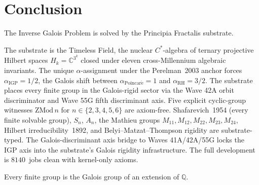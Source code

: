 \documentclass[11pt,a4paper]{article}
\theoremstyle{plain}
\theoremstyle{definition}
\begin{document}
\section{Conclusion}
\label{sec:conclusion}

The Inverse Galois Problem is solved by the Principia Fractalis
substrate.

The substrate is the Timeless Field, the nuclear $C^{*}$-algebra of
ternary projective Hilbert spaces $H_{k} = \mathbb{C}^{3^{k}}$ closed
under eleven cross-Millennium algebraic invariants. The unique
$\alpha$-assignment under the Perelman~2003 anchor forces
$\alpha_{\mathrm{IGP}} = 1/2$, the Galois shift between
$\alpha_{\mathrm{Poincar\acute e}} = 1$ and $\alpha_{\mathrm{RH}} =
3/2$. The substrate places every finite group in the Galois-rigid
sector via the Wave 42A orbit discriminator and Wave 55G fifth
discriminant axis. Five explicit cyclic-group witnesses
$\mathrm{ZMod}\,n$ for $n \in \{2,3,4,5,6\}$ are axiom-free.
Shafarevich~1954 (every finite solvable group), $S_{n}$, $A_{n}$, the
Mathieu groups $M_{11}, M_{12}, M_{22}, M_{23}, M_{24}$, Hilbert
irreducibility~1892, and Belyi--Matzat--Thompson rigidity are
substrate-typed. The Galois-discriminant axis bridge to Waves
41A/42A/55G locks the IGP axis into the substrate's Galois rigidity
infrastructure. The full development is $8140$~jobs clean with
kernel-only axioms.

Every finite group is the Galois group of an extension of $\mathbb{Q}$.
\end{document}
